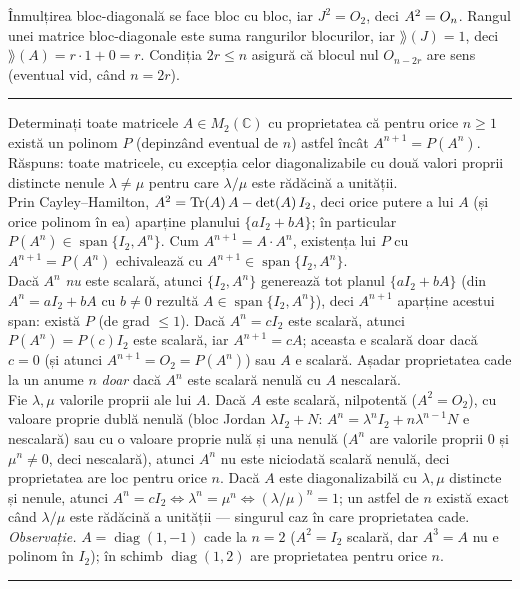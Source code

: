 Înmulțirea bloc-diagonală se face bloc cu bloc, iar $J^2=O_2$, deci $A^2=O_n$. Rangul unei matrice bloc-diagonale este suma rangurilor blocurilor, iar $\rang(J)=1$, deci $\rang(A)=r\cdot1+0=r$. Condiția $2r\le n$ asigură că blocul nul $O_{n-2r}$ are sens (eventual vid, când $n=2r$).
\vspace{1mm}\hrule

Determinați toate matricele $A\in M_2(\mathbb{C})$ cu proprietatea că pentru orice $n\ge1$ există un polinom $P$ (depinzând eventual de $n$) astfel încât $A^{n+1}=P(A^n)$.
\sol Răspuns: toate matricele, cu excepția celor diagonalizabile cu două valori proprii distincte nenule $\lambda\neq\mu$ pentru care $\lambda/\mu$ este rădăcină a unității.\\[2pt]
Prin Cayley--Hamilton, $A^2=\operatorname{Tr}(A)\,A-\det(A)\,I_2$, deci orice putere a lui $A$ (și orice polinom în ea) aparține planului $\{aI_2+bA\}$; în particular $P(A^n)\in\operatorname{span}\{I_2,A^n\}$. Cum $A^{n+1}=A\cdot A^n$, existența lui $P$ cu $A^{n+1}=P(A^n)$ echivalează cu $A^{n+1}\in\operatorname{span}\{I_2,A^n\}$.\\[2pt]
Dacă $A^n$ \emph{nu} este scalară, atunci $\{I_2,A^n\}$ generează tot planul $\{aI_2+bA\}$ (din $A^n=aI_2+bA$ cu $b\neq0$ rezultă $A\in\operatorname{span}\{I_2,A^n\}$), deci $A^{n+1}$ aparține acestui span: există $P$ (de grad $\le1$). Dacă $A^n=cI_2$ este scalară, atunci $P(A^n)=P(c)I_2$ este scalară, iar $A^{n+1}=cA$; aceasta e scalară doar dacă $c=0$ (și atunci $A^{n+1}=O_2=P(A^n)$) sau $A$ e scalară. Așadar proprietatea cade la un anume $n$ \emph{doar} dacă $A^n$ este scalară nenulă cu $A$ nescalară.\\[2pt]
Fie $\lambda,\mu$ valorile proprii ale lui $A$. Dacă $A$ este scalară, nilpotentă ($A^2=O_2$), cu valoare proprie dublă nenulă (bloc Jordan $\lambda I_2+N$: $A^n=\lambda^nI_2+n\lambda^{n-1}N$ e nescalară) sau cu o valoare proprie nulă și una nenulă ($A^n$ are valorile proprii $0$ și $\mu^n\neq0$, deci nescalară), atunci $A^n$ nu este niciodată scalară nenulă, deci proprietatea are loc pentru orice $n$. Dacă $A$ este diagonalizabilă cu $\lambda,\mu$ distincte și nenule, atunci $A^n=cI_2\iff\lambda^n=\mu^n\iff(\lambda/\mu)^n=1$; un astfel de $n$ există exact când $\lambda/\mu$ este rădăcină a unității --- singurul caz în care proprietatea cade.\\[2pt]
\emph{Observație.} $A=\operatorname{diag}(1,-1)$ cade la $n=2$ ($A^2=I_2$ scalară, dar $A^3=A$ nu e polinom în $I_2$); în schimb $\operatorname{diag}(1,2)$ are proprietatea pentru orice $n$.
\vspace{1mm}\hrule

